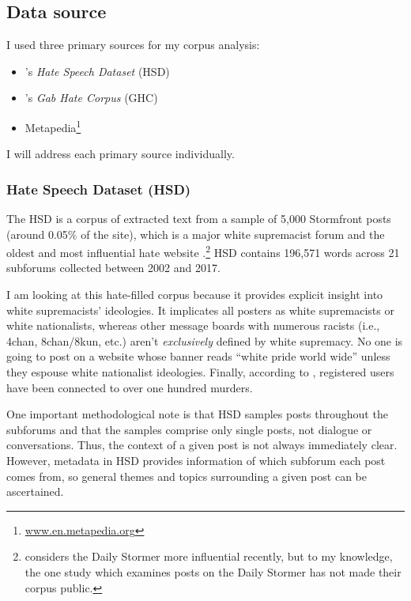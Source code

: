 \documentclass[output=paper,colorlinks,citecolor=brown]{langscibook}
\begin{document}
\subsection{Data source}

I used three primary sources for my corpus analysis:

\begin{itemize}
    \item \cite {jp:deGilbertCuadros2018}'s \emph{Hate Speech Dataset} (HSD)
    \item \cite{jp:KennedyDehghani2022}'s \emph{Gab Hate Corpus} (GHC)
    \item Metapedia\footnote{\url{www.en.metapedia.org}}
\end{itemize}
I will address each primary source individually.

\subsubsection{Hate Speech Dataset (HSD)}

The HSD is a corpus of extracted text from a sample of 5,000 Stormfront posts (around 0.05\% of the site), which is a major white supremacist forum and the oldest and most influential hate website \citep{jp:Hartzell2020}.\footnote{\citet{jp:SouthernPovertyLawCenter2022} considers the Daily Stormer more influential recently, but to my knowledge, the one study which examines posts on the Daily Stormer \citep{jp:Calderón2021} has not made their corpus public.} HSD contains 196,571 words across 21 subforums collected between 2002 and 2017.

I am looking at this hate-filled corpus because it provides explicit insight into white supremacists' ideologies. It implicates all posters as white supremacists or white nationalists, whereas other message boards with numerous racists (i.e., 4chan, 8chan/8kun, etc.) aren't \emph{exclusively} defined by white supremacy. No one is going to post on a website whose banner reads ``white pride world wide'' unless they espouse white nationalist ideologies. Finally, according to \citet{jp:Beirich2014}, registered users have been connected to over one hundred murders.

One important methodological note is that HSD samples posts throughout the subforums and that the samples comprise only single posts, not dialogue or conversations. Thus, the context of a given post is not always immediately clear. However, metadata in HSD provides information of which subforum each post comes from, so general themes and topics surrounding a given post can be ascertained.
\end{document}
